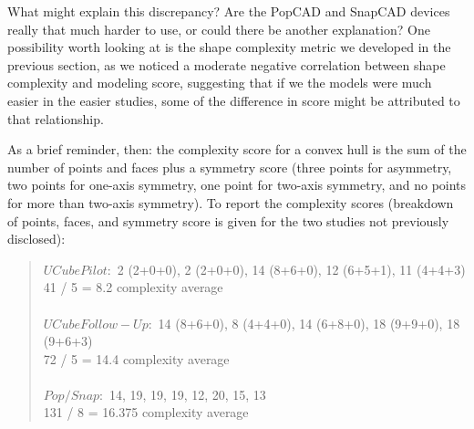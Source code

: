 What might explain this discrepancy? Are the PopCAD and SnapCAD devices really
that much harder to use, or could there be another explanation? One possibility
worth looking at is the shape complexity metric we developed in the previous
section, as we noticed a moderate negative correlation between shape complexity
and modeling score, suggesting that if we the models were much easier in the
easier studies, some of the difference in score might be attributed to that
relationship.

As a brief reminder, then: the complexity score for a convex hull is the sum of
the number of points and faces plus a symmetry score (three points for
asymmetry, two points for one-axis symmetry, one point for two-axis symmetry,
and no points for more than two-axis symmetry). To report the complexity scores
(breakdown of points, faces, and symmetry score is given for the two studies not
previously disclosed):
\begin{quote}
	$UCube Pilot:$ 2 (2+0+0), 2 (2+0+0), 14 (8+6+0), 12 (6+5+1), 11 (4+4+3) \\
	41 / 5 = 8.2 complexity average \\
	\\
	$UCube Follow-Up:$ 14 (8+6+0), 8 (4+4+0), 14 (6+8+0), 18 (9+9+0), 18 (9+6+3) \\
	72 / 5 = 14.4 complexity average \\
	\\
	$Pop/Snap:$ 14, 19, 19, 19, 12, 20, 15, 13 \\
	131 / 8 = 16.375 complexity average \\
	
\end{quote}

